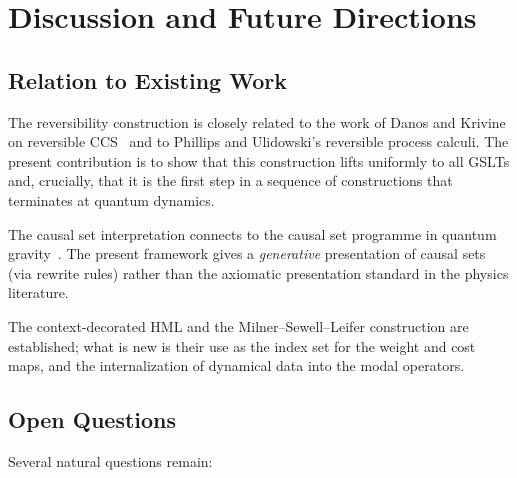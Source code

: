 \chapter{Discussion and Future Directions}

\section{Relation to Existing Work}

The reversibility construction is closely related to the work of Danos and
Krivine on reversible CCS~\cite{danos2004reversible} and to Phillips and
Ulidowski's reversible process calculi.  The present contribution is to
show that this construction lifts uniformly to all GSLTs and, crucially,
that it is the first step in a sequence of constructions that terminates at
quantum dynamics.

The causal set interpretation connects to the causal set programme in quantum
gravity~\cite{bombelli1987space}.  The present framework gives a \emph{generative}
presentation of causal sets (via rewrite rules) rather than the axiomatic
presentation standard in the physics literature.

The context-decorated HML and the Milner--Sewell--Leifer construction are
established; what is new is their use as the index set for the weight and
cost maps, and the internalization of dynamical data into the modal operators.

\section{Open Questions}

Several natural questions remain:

